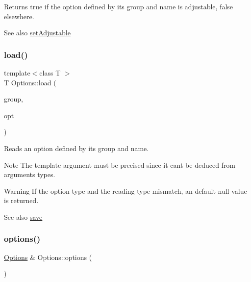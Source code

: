 Returns {\ttfamily true} if the option defined by its group and name is adjustable, {\ttfamily false} elsewhere.

\begin{DoxySeeAlso}{See also}
\hyperlink{struct_options_a086db8fe7688ddcb3b74db85262a5ba0}{set\+Adjustable} 
\end{DoxySeeAlso}
\hypertarget{struct_options_ada32d485296bd6ba73a1d95bd6260c1a}{}\label{struct_options_ada32d485296bd6ba73a1d95bd6260c1a} 
\subsubsection{\texorpdfstring{load()}{load()}}
{\footnotesize\ttfamily template$<$class T $>$ \\
T Options\+::load (\begin{DoxyParamCaption}\item[{Q\+String}]{group,  }\item[{Q\+String}]{opt }\end{DoxyParamCaption})\hspace{0.3cm}{\ttfamily [inline]}}

Reads an option defined by its group and name.

\begin{DoxyNote}{Note}
The template argument must be precised since it can\textquotesingle{}t be deduced from arguments\textquotesingle{} types.
\end{DoxyNote}
\begin{DoxyWarning}{Warning}
If the option type and the reading type mismatch, an default null value is returned.
\end{DoxyWarning}
\begin{DoxySeeAlso}{See also}
\hyperlink{struct_options_ad20146ff9544f6229bb1696ea5bf643d}{save} 
\end{DoxySeeAlso}
\hypertarget{struct_options_aa3dd7609fbc5d54af65992632bff842a}{}\label{struct_options_aa3dd7609fbc5d54af65992632bff842a} 
\subsubsection{\texorpdfstring{options()}{options()}}
{\footnotesize\ttfamily \hyperlink{struct_options}{Options} \& Options\+::options (\begin{DoxyParamCaption}{ }\end{DoxyParamCaption})\hspace{0.3cm}{\ttfamily [static]}}

